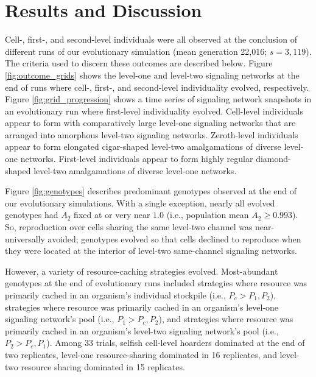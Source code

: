 \section{Results and Discussion}













Cell-, first-, and second-level individuals were all observed at the conclusion of different runs of our evolutionary simulation (mean generation 22,016; $s=3,119$).
The criteria used to discern these outcomes are described below.
Figure \ref{fig:outcome_grids} shows the level-one and level-two signaling networks at the end of runs where cell-, first-, and second-level individuality evolved, respectively.
Figure \ref{fig:grid_progression} shows a time series of signaling network snapshots in an evolutionary run where first-level individuality evolved.
Cell-level individuals appear to form with comparatively large level-one signaling networks that are arranged into amorphous level-two signaling networks.
Zeroth-level individuals appear to form elongated cigar-shaped level-two amalgamations of diverse level-one networks.
First-level individuals appear to form highly regular diamond-shaped level-two amalgamations of diverse level-one networks.

Figure \ref{fig:genotypes} describes predominant genotypes observed at the end of our evolutionary simulations.
With a single exception, nearly all evolved genotypes had $A_2$ fixed at or very near $1.0$ (i.e., population mean $A_2 \geq 0.993$).
So, reproduction over cells sharing the same level-two channel was near-universally avoided;
genotypes evolved so that cells declined to reproduce when they were located at the interior of level-two same-channel signaling networks.

However, a variety of resource-caching strategies evolved.
Most-abundant genotypes at the end of evolutionary runs included strategies where resource was primarily cached in an organism's individual stockpile (i.e., $P_{c} > P_1, P_2$), strategies where resource was primarily cached in an organism's level-one signaling network's pool (i.e., $P_1 > P_{c}, P_2$), and strategies where resource was primarily cached in an organism's level-two signaling network's pool (i.e., $P_2 > P_{c}, P_1$).
Among 33 trials, selfish cell-level hoarders dominated at the end of two replicates, level-one resource-sharing dominated in 16 replicates, and level-two resource sharing dominated in 15 replicates.

